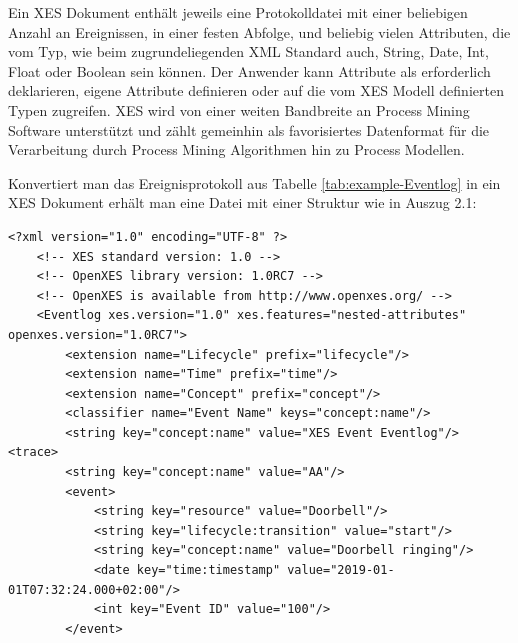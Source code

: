 Ein XES Dokument enthält jeweils eine Protokolldatei mit einer beliebigen Anzahl an Ereignissen, in einer festen Abfolge, und beliebig vielen Attributen, die vom Typ, wie beim zugrundeliegenden XML Standard auch, String, Date, Int, Float oder Boolean sein können. 
Der Anwender kann Attribute als erforderlich deklarieren, eigene Attribute definieren oder auf die vom XES Modell definierten Typen zugreifen. XES  wird von einer weiten Bandbreite an Process Mining Software unterstützt und zählt gemeinhin als favorisiertes Datenformat für die Verarbeitung durch Process Mining Algorithmen hin zu Process Modellen.

Konvertiert man das Ereignisprotokoll aus Tabelle \ref{tab:example-Eventlog} in ein XES Dokument erhält man eine Datei mit einer Struktur wie in Auszug 2.1:
\small
\lstset{language=XML}
\begin{lstlisting}[label=lst:xes,caption=Auszug aus XES Datei zu Eventlog in Tabelle 2,captionpos=b]
<?xml version="1.0" encoding="UTF-8" ?>
    <!-- XES standard version: 1.0 -->
    <!-- OpenXES library version: 1.0RC7 -->
    <!-- OpenXES is available from http://www.openxes.org/ -->
    <Eventlog xes.version="1.0" xes.features="nested-attributes" openxes.version="1.0RC7">
    	<extension name="Lifecycle" prefix="lifecycle"/>
    	<extension name="Time" prefix="time"/>
    	<extension name="Concept" prefix="concept"/>
    	<classifier name="Event Name" keys="concept:name"/>
    	<string key="concept:name" value="XES Event Eventlog"/>	<trace>
		<string key="concept:name" value="AA"/>
		<event>
			<string key="resource" value="Doorbell"/>
			<string key="lifecycle:transition" value="start"/>
			<string key="concept:name" value="Doorbell ringing"/>
			<date key="time:timestamp" value="2019-01-01T07:32:24.000+02:00"/>
			<int key="Event ID" value="100"/>
		</event>
	
\end{lstlisting}
\normalsize